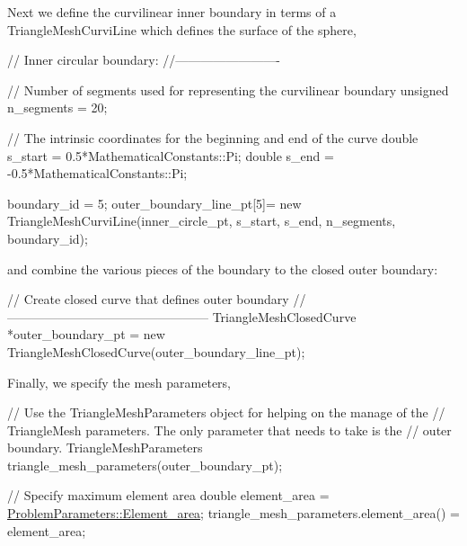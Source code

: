 Next we define the curvilinear inner boundary in terms of a {\ttfamily Triangle\+Mesh\+Curvi\+Line} which defines the surface of the sphere,

 
\begin{DoxyCodeInclude}
 \textcolor{comment}{// Inner circular boundary:}
 \textcolor{comment}{//-------------------------}

 \textcolor{comment}{// Number of segments used for representing the curvilinear boundary}
 \textcolor{keywordtype}{unsigned} n\_segments = 20;

 \textcolor{comment}{// The intrinsic coordinates for the beginning and end of the curve}
 \textcolor{keywordtype}{double} s\_start =  0.5*MathematicalConstants::Pi;
 \textcolor{keywordtype}{double} s\_end   =  -0.5*MathematicalConstants::Pi;

 boundary\_id = 5;
 outer\_boundary\_line\_pt[5]=
  \textcolor{keyword}{new} TriangleMeshCurviLine(inner\_circle\_pt,
                            s\_start,
                            s\_end,
                            n\_segments,
                            boundary\_id);

\end{DoxyCodeInclude}


and combine the various pieces of the boundary to the closed outer boundary\+:

 
\begin{DoxyCodeInclude}
 \textcolor{comment}{// Create closed curve that defines outer boundary}
 \textcolor{comment}{//------------------------------------------------}
 TriangleMeshClosedCurve *outer\_boundary\_pt =
  \textcolor{keyword}{new} TriangleMeshClosedCurve(outer\_boundary\_line\_pt);

\end{DoxyCodeInclude}


Finally, we specify the mesh parameters,

 
\begin{DoxyCodeInclude}
 \textcolor{comment}{// Use the TriangleMeshParameters object for helping on the manage of the}
 \textcolor{comment}{// TriangleMesh parameters. The only parameter that needs to take is the}
 \textcolor{comment}{// outer boundary.}
 TriangleMeshParameters triangle\_mesh\_parameters(outer\_boundary\_pt);


 \textcolor{comment}{// Specify maximum element area}
 \textcolor{keywordtype}{double} element\_area = \hyperlink{namespaceProblemParameters_aafe26abadfce87800a6a4676f0476956}{ProblemParameters::Element\_area};
 triangle\_mesh\_parameters.element\_area() = element\_area;

\end{DoxyCodeInclude}


